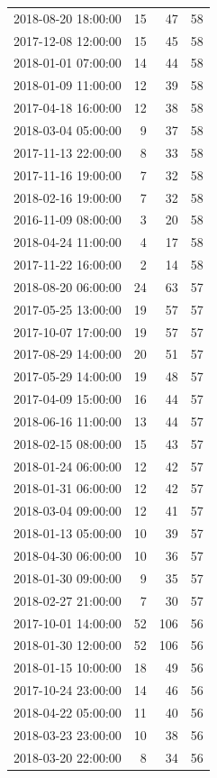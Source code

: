 \begin{tabular}{lrrr}
2018-08-20 18:00:00 & 15 & 47 & 58 \\
2017-12-08 12:00:00 & 15 & 45 & 58 \\
2018-01-01 07:00:00 & 14 & 44 & 58 \\
2018-01-09 11:00:00 & 12 & 39 & 58 \\
2017-04-18 16:00:00 & 12 & 38 & 58 \\
2018-03-04 05:00:00 & 9 & 37 & 58 \\
2017-11-13 22:00:00 & 8 & 33 & 58 \\
2017-11-16 19:00:00 & 7 & 32 & 58 \\
2018-02-16 19:00:00 & 7 & 32 & 58 \\
2016-11-09 08:00:00 & 3 & 20 & 58 \\
2018-04-24 11:00:00 & 4 & 17 & 58 \\
2017-11-22 16:00:00 & 2 & 14 & 58 \\
2018-08-20 06:00:00 & 24 & 63 & 57 \\
2017-05-25 13:00:00 & 19 & 57 & 57 \\
2017-10-07 17:00:00 & 19 & 57 & 57 \\
2017-08-29 14:00:00 & 20 & 51 & 57 \\
2017-05-29 14:00:00 & 19 & 48 & 57 \\
2017-04-09 15:00:00 & 16 & 44 & 57 \\
2018-06-16 11:00:00 & 13 & 44 & 57 \\
2018-02-15 08:00:00 & 15 & 43 & 57 \\
2018-01-24 06:00:00 & 12 & 42 & 57 \\
2018-01-31 06:00:00 & 12 & 42 & 57 \\
2018-03-04 09:00:00 & 12 & 41 & 57 \\
2018-01-13 05:00:00 & 10 & 39 & 57 \\
2018-04-30 06:00:00 & 10 & 36 & 57 \\
2018-01-30 09:00:00 & 9 & 35 & 57 \\
2018-02-27 21:00:00 & 7 & 30 & 57 \\
2017-10-01 14:00:00 & 52 & 106 & 56 \\
2018-01-30 12:00:00 & 52 & 106 & 56 \\
2018-01-15 10:00:00 & 18 & 49 & 56 \\
2017-10-24 23:00:00 & 14 & 46 & 56 \\
2018-04-22 05:00:00 & 11 & 40 & 56 \\
2018-03-23 23:00:00 & 10 & 38 & 56 \\
2018-03-20 22:00:00 & 8 & 34 & 56 \\

\end{tabular}
